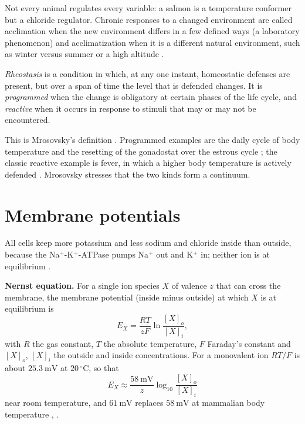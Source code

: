 Not every animal regulates every
variable: a salmon is a temperature
conformer but a chloride regulator.
Chronic responses to a changed
environment are called acclimation when
the new environment differs in a few
defined ways (a laboratory phenomenon)
and acclimatization when it is a
different natural environment, such as
winter versus summer or a high altitude
\cite[Chapter 1]{hill2012animal}.

\begin{definition}
\label{definition-rheostasis}
\emph{Rheostasis} is a condition in which,
at any one instant, homeostatic defenses
are present, but over a span of time the
level that is defended changes. It is
\emph{programmed} when the change is
obligatory at certain phases of the life
cycle, and \emph{reactive} when it occurs
in response to stimuli that may or may
not be encountered.
\end{definition}

This is Mrosovsky's definition
\cite[Chapter 3]{mrosovsky1990rheostasis}.
Programmed examples are the daily cycle
of body temperature and the resetting of
the gonadostat over the estrous cycle
\cite[Chapter 4]{mrosovsky1990rheostasis};
the classic reactive example is fever,
in which a higher body temperature is
actively defended
\cite[Chapter 5]{mrosovsky1990rheostasis}.
Mrosovsky stresses that the two kinds
form a continuum.

\section{Membrane potentials}
\label{section-membrane-potential}

All cells keep more potassium and less
sodium and chloride inside than outside,
because the Na$^+$-K$^+$-ATPase pumps
Na$^+$ out and K$^+$ in; neither ion is
at equilibrium \cite[Chapter
12]{hill2012animal}.

\textbf{Nernst equation.}
For a single ion species $X$ of valence
$z$ that can cross the membrane, the
membrane potential (inside minus
outside) at which $X$ is at equilibrium
is
\begin{equation}
\label{equation-nernst}
E_X = \frac{RT}{zF}
\ln\frac{[X]_o}{[X]_i},
\end{equation}
with $R$ the gas constant, $T$ the
absolute temperature, $F$ Faraday's
constant and $[X]_o$, $[X]_i$ the outside
and inside concentrations. For a
monovalent ion $RT/F$ is about
$25.3\ \mathrm{mV}$ at
$20\,^{\circ}\mathrm{C}$,
so that
$$
E_X \approx \frac{58\ \mathrm{mV}}{z}
\log_{10}\frac{[X]_o}{[X]_i}
$$
near room temperature, and $61\
\mathrm{mV}$ replaces $58\ \mathrm{mV}$
at mammalian body temperature
\cite[Chapter 12]{hill2012animal},
\cite[Chapter 5]{randall1997eckert}.

